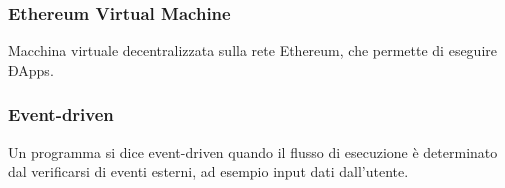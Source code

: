 \subsubsection*{Ethereum Virtual Machine}
Macchina virtuale decentralizzata sulla rete Ethereum, che permette di eseguire ÐApps\glo.

\subsubsection*{Event-driven}
Un programma si dice event-driven quando il flusso di esecuzione è determinato dal verificarsi di eventi esterni, ad esempio input dati dall'utente.

